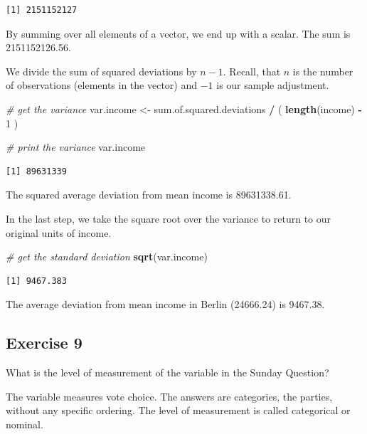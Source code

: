 \documentclass[]{book}
\newenvironment{Shaded}{\begin{snugshade}}{\end{snugshade}}
\newcommand{\KeywordTok}[1]{\textcolor[rgb]{0.13,0.29,0.53}{\textbf{#1}}}
\newcommand{\DecValTok}[1]{\textcolor[rgb]{0.00,0.00,0.81}{#1}}
\newcommand{\StringTok}[1]{\textcolor[rgb]{0.31,0.60,0.02}{#1}}
\newcommand{\CommentTok}[1]{\textcolor[rgb]{0.56,0.35,0.01}{\textit{#1}}}
\newcommand{\OperatorTok}[1]{\textcolor[rgb]{0.81,0.36,0.00}{\textbf{#1}}}
\newcommand{\NormalTok}[1]{#1}
\theoremstyle{definition}
\theoremstyle{definition}
\theoremstyle{definition}
\theoremstyle{remark}
\begin{document}
\begin{verbatim}
[1] 2151152127
\end{verbatim}

By summing over all elements of a vector, we end up with a scalar. The
sum is 2151152126.56.

We divide the sum of squared deviations by \(n-1\). Recall, that \(n\)
is the number of observations (elements in the vector) and \(-1\) is our
sample adjustment.

\begin{Shaded}
\begin{Highlighting}[]
\CommentTok{# get the variance}
\NormalTok{var.income <-}\StringTok{ }\NormalTok{sum.of.squared.deviations }\OperatorTok{/}\StringTok{ }\NormalTok{( }\KeywordTok{length}\NormalTok{(income) }\OperatorTok{-}\StringTok{ }\DecValTok{1}\NormalTok{ )}

\CommentTok{# print the variance}
\NormalTok{var.income}
\end{Highlighting}
\end{Shaded}

\begin{verbatim}
[1] 89631339
\end{verbatim}

The squared average deviation from mean income is 89631338.61.

In the last step, we take the square root over the variance to return to
our original units of income.

\begin{Shaded}
\begin{Highlighting}[]
\CommentTok{# get the standard deviation}
\KeywordTok{sqrt}\NormalTok{(var.income)}
\end{Highlighting}
\end{Shaded}

\begin{verbatim}
[1] 9467.383
\end{verbatim}

The average deviation from mean income in Berlin (24666.24) is 9467.38.

\subsection{Exercise 9}\label{exercise-9}

What is the level of measurement of the variable in the Sunday Question?

The variable measures vote choice. The answers are categories, the
parties, without any specific ordering. The level of measurement is
called categorical or nominal.
\end{document}
